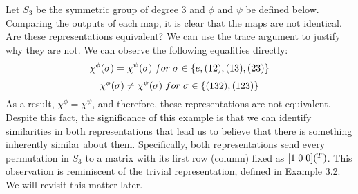 \begin{example}\end{example} 
	Let $S_3$ be the symmetric group of degree 3 and $\phi$ and $\psi$ be defined below. Comparing the outputs of each map, it is clear that the maps are not identical. Are these representations equivalent? We can use the trace argument to justify why they are not. We can observe the following equalities directly: 
$$\chi^{\phi}(\sigma) = \chi^{\psi}(\sigma) \hspace{1mm} for \hspace{1mm} \sigma \in \{e, (12), (13), (23)\}$$
$$\chi^{\phi}(\sigma) \neq \chi^{\psi}(\sigma) \hspace{1mm} for \hspace{1mm} \sigma \in \{(132), (123)\}$$
As a result, $\chi^{\phi} = \chi^{\psi}$, and therefore, these representations are not equivalent. Despite this fact, the significance of this example is that we can identify similarities in both representations that lead us to believe that there is something inherently similar about them. Specifically, both representations send every permutation in $S_3$ to a matrix with its first row (column) fixed as $[1 \hspace{1mm} 0 \hspace{1mm} 0](^T)$. This observation is reminiscent of the trivial representation, defined in Example 3.2. We will revisit this matter later.
\\
	\renewcommand{\arraystretch}{1.25}
